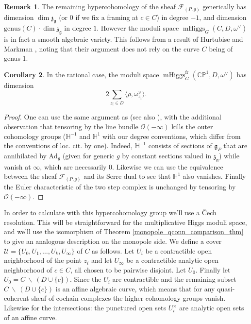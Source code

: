 \documentclass[11pt, oneside, reqno]{amsart}
\theoremstyle{definition} \newtheorem{definition}{Definition}[section]
\newtheorem{corollary}[definition]{Corollary}
\theoremstyle{definition} \newtheorem{remark}[definition]{Remark}
\theoremstyle{definition} \newtheorem{remarks}[definition]{Remarks}
\theoremstyle{definition} \newtheorem{question}[definition]{Question}
\theoremstyle{definition} \newtheorem*{note}{Note}
\theoremstyle{definition} \newtheorem{example}[definition]{Example}
\theoremstyle{definition} \newtheorem{examples}[definition]{Examples}
\renewcommand{\gg}{\mathfrak{g}}
\newcommand{\bb}[1]{\mathbb{#1}}
\newcommand{\mr}[1]{\mathrm{#1}}
\newcommand{\mc}[1]{\mathcal{#1}}
\newcommand{\mf}[1]{\mathfrak{#1}}
\newcommand{\bs}{\ \backslash \ }
\newcommand{\OO}{\mathcal{O}}
\DeclareMathOperator{\mhiggs}{mHiggs}
\newcommand{\fr}{\mathrm{fr}}
\newcommand{\Ad}{\mr{Ad}}
\begin{document}
\begin{remark}
The remaining hypercohomology of the sheaf $\mc F_{(P,g)}$ generically has dimension $\dim \mf z_{\gg}$ (or 0 if we fix a framing at $c \in C$) in degree $-1$, and dimension $\mr{genus}(C) \cdot \dim \mf z_{\gg}$ in degree $1$.  However the moduli space $\mhiggs_G(C, D,\omega^\vee)$ is in fact a smooth algebraic variety.  This follows from a result of Hurtubise and Markman \cite[Theorem 4.13]{HurtubiseMarkman}, noting that their argument does not rely on the curve $C$ being of genus 1.
\end{remark}

\begin{corollary} \label{dim_of_moduli_space_cor}
In the rational case, the moduli space $\mhiggs^\fr_G(\bb{CP}^1, D, \omega^\vee)$ has dimension 
\[2 \sum_{z_i \in D} \langle \rho, \omega^\vee_{z_i} \rangle.\]
\end{corollary}

\begin{proof}
One can use the same argument as \cite{HurtubiseMarkman} (see also \cite[Proposition 5.6]{CharbonneauHurtubise}), with the additional observation that tensoring by the line bundle $\OO(-\infty)$ kills the outer cohomology groups ($\bb H^{-1}$ and $\bb H^1$ with our degree conventions, which differ from the conventions of loc. cit. by one).  Indeed, $\bb H^{-1}$ consists of sections of $\gg_P$ that are annihilated by $\Ad_g$ (given for generic $g$ by constant sections valued in $\mf z_{\gg}$) while vanish at $\infty$, which are necessarily 0.  Likewise we can use the equivalence between the sheaf $\mc F_{(P,g)}$ and its Serre dual to see that $\bb H^1$ also vanishes.  Finally the Euler characteristic of the two step complex is unchanged by tensoring by $\OO(-\infty)$. 
\end{proof}

In order to calculate with this hypercohomology group we'll use a \v Cech resolution.  This will be straightforward for the multiplicative Higgs moduli space, and we'll use the isomorphism of Theorem \ref{monopole_qconn_comparison_thm} to give an analogous description on the monopole side.    We define a cover $\mc U = \{U_0, U_1, \ldots, U_k, U_\infty\}$ of $C$ as follows.  Let $U_i$ be a contractible open neighborhood of the point $z_i$ and let $U_\infty$ be a contractible analytic open neighborhood of $c \in C$, all chosen to be pairwise disjoint.  Let $U_0$.  Finally let $U_0 = C \bs (D \cup \{c\})$.  Since the $U_i$ are contractible and the remaining subset $C \bs (D \cup \{c\})$ is an affine algebraic curve, which means that for any quasi-coherent sheaf of cochain complexes the higher cohomology groups vanish.  Likewise for the intersections: the punctured open sets $U_i^\times$ are analytic open sets of an affine curve.  
\end{document}
